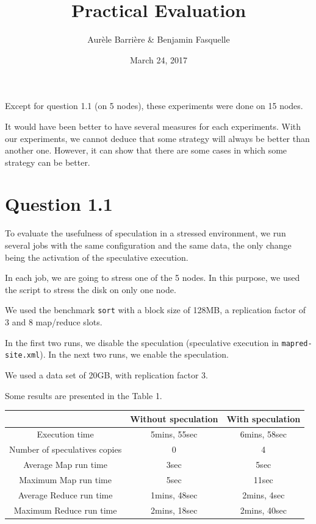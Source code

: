 \documentclass{article}
\author{Aur\`ele Barri\`ere \& Benjamin Fasquelle}
\title{Practical Evaluation}
\date{March 24, 2017}
\def\file#1{\texttt{#1}}
\def\bench#1{\texttt{#1}}
\begin{document}
\maketitle

Except for question 1.1 (on 5 nodes), these experiments were done on 15 nodes.

It would have been better to have several measures for each experiments. With our experiments, we cannot deduce that some strategy will always be better than another one. However, it can show that there are some cases in which some strategy can be better.

\section*{Question 1.1}
To evaluate the usefulness of speculation in a stressed environment, we run several jobs with the same configuration and the same data, the only change being the activation of the speculative execution.

In each job, we are going to stress one of the 5 nodes. In this purpose, we used the script to stress the disk on only one node.

We used the benchmark \bench{sort} with a block size of 128MB, a replication factor of 3 and 8 map/reduce slots.

In the first two runs, we disable the speculation (speculative execution in \file{mapred-site.xml}).
In the next two runs, we enable the speculation.


We used a data set of 20GB, with replication factor 3.

Some results are presented in the Table 1.

\begin{center}
\begin{tabular}{|c|c|c|}
\hline
\ & Without speculation & With speculation \\
\hline
Execution time & 5mins, 55sec & 6mins, 58sec \\
\hline
Number of speculatives copies & 0 & 4 \\
\hline
Average Map run time & 3sec & 5sec \\
\hline
Maximum Map run time & 5sec & 11sec \\
\hline
Average Reduce run time & 1mins, 48sec & 2mins, 4sec \\
\hline
Maximum Reduce run time & 2mins, 18sec & 2mins, 40sec \\
\hline
\end{tabular}
\end{center}
\end{document}
